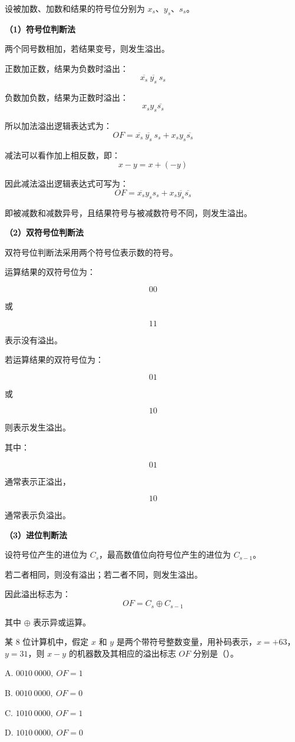 \begin{analysisenv}
设被加数、加数和结果的符号位分别为 $x_s$、$y_s$、$s_s$。

\textbf{（1）符号位判断法}

两个同号数相加，若结果变号，则发生溢出。

正数加正数，结果为负数时溢出：
\[
\overline{x_s}\ \overline{y_s}\ s_s
\]

负数加负数，结果为正数时溢出：
\[
x_s y_s \overline{s_s}
\]

所以加法溢出逻辑表达式为：
\[
OF=\overline{x_s}\ \overline{y_s}\ s_s+x_s y_s \overline{s_s}
\]

减法可以看作加上相反数，即：
\[
x-y=x+(-y)
\]

因此减法溢出逻辑表达式可写为：
\[
OF=\overline{x_s}y_s s_s+x_s\overline{y_s}\overline{s_s}
\]

即被减数和减数异号，且结果符号与被减数符号不同，则发生溢出。

\textbf{（2）双符号位判断法}

双符号位判断法采用两个符号位表示数的符号。

运算结果的双符号位为：

\[
00
\]

或

\[
11
\]

表示没有溢出。

若运算结果的双符号位为：

\[
01
\]

或

\[
10
\]

则表示发生溢出。

其中：

\[
01
\]

通常表示正溢出，

\[
10
\]

通常表示负溢出。

\textbf{（3）进位判断法}

设符号位产生的进位为 $C_s$，最高数值位向符号位产生的进位为 $C_{s-1}$。

若二者相同，则没有溢出；若二者不同，则发生溢出。

因此溢出标志为：
\[
OF=C_s\oplus C_{s-1}
\]

其中 $\oplus$ 表示异或运算。
\end{analysisenv}




\begin{question}
某 $8$ 位计算机中，假定 $x$ 和 $y$ 是两个带符号整数变量，用补码表示，$x=+63$，$y=31$，则 $x-y$ 的机器数及其相应的溢出标志 $OF$ 分别是（）。

A. $0010\ 0000,\ OF=1$

B. $0010\ 0000,\ OF=0$

C. $1010\ 0000,\ OF=1$

D. $1010\ 0000,\ OF=0$
\end{question}

